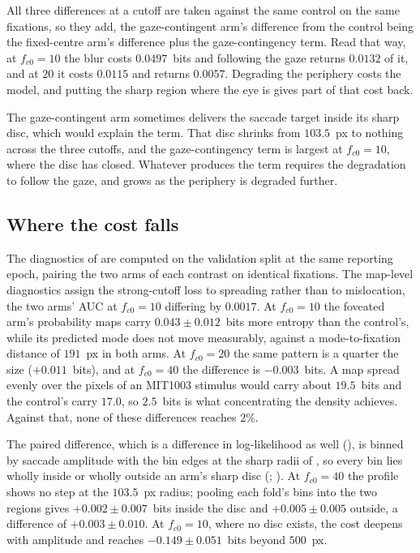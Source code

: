 All three differences at a cutoff are taken against the same control on the same fixations, so they add,
the gaze-contingent arm's difference from the control being the fixed-centre arm's difference
plus the gaze-contingency term. Read that way, at $f_{c0} = 10$ the blur costs $0.0497$~bits and
following the gaze returns $0.0132$ of it, and at $20$ it costs $0.0115$ and returns $0.0057$.
Degrading the periphery costs the model, and putting the sharp region where the eye is gives part of
that cost back.

The gaze-contingent arm sometimes delivers the saccade target inside its sharp disc, which would explain
the term. That disc shrinks from $103.5$~px to nothing across the three cutoffs, and the
gaze-contingency term is largest at $f_{c0} = 10$, where the disc has closed.
Whatever produces the term requires the degradation to follow the gaze, and grows as the periphery is
degraded further.

\subsection{Where the cost falls}
\label{subsec:results-diagnostics}

The diagnostics of  are computed on the validation split at the same reporting
epoch, pairing the two arms of each contrast on identical fixations.
The map-level diagnostics assign the strong-cutoff loss to spreading rather than to mislocation, the two
arms' AUC at $f_{c0} = 10$ differing by $0.0017$.
At $f_{c0} = 10$ the foveated arm's probability maps carry $0.043 \pm 0.012$~bits more entropy than the
control's, while its predicted mode does not move measurably, against a mode-to-fixation distance of
$191$~px in both arms.
At $f_{c0} = 20$ the same pattern is a quarter the size ($+0.011$~bits), and at $f_{c0} = 40$ the
difference is $-0.003$~bits.
A map spread evenly over the pixels of an MIT1003 stimulus would carry about $19.5$~bits and the
control's carry $17.0$, so $2.5$~bits is what concentrating the density achieves. Against that, none of these
differences reaches $2\%$.

The paired difference, which is a difference in log-likelihood as well
(), is binned by saccade amplitude with the bin edges at the sharp radii of
, so every bin lies wholly inside or wholly outside an arm's sharp disc
(; ).
At $f_{c0} = 40$ the profile shows no step at the $103.5$~px radius; pooling each fold's bins into the two
regions gives $+0.002 \pm 0.007$~bits inside the disc and $+0.005 \pm 0.005$ outside, a difference of
$+0.003 \pm 0.010$.
At $f_{c0} = 10$, where no disc exists, the cost deepens with amplitude and reaches
$-0.149 \pm 0.051$~bits beyond $500$~px.

